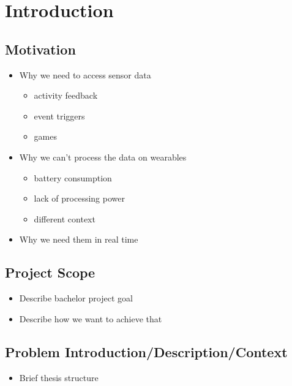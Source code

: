 \section{Introduction}
\label{sec:intro}


\subsection{Motivation}
\begin{itemize}[noitemsep]
	\item Why we need to access sensor data
		\begin{itemize}
			\item activity feedback
			\item event triggers
			\item games
		\end{itemize}
	\item Why we can't process the data on wearables
		\begin{itemize}
			\item battery consumption
			\item lack of processing power
			\item different context
		\end{itemize}
	\item Why we need them in real time
\end{itemize}
\lipsum[1]
\lipsum[2]


\subsection{Project Scope}
\begin{itemize}[noitemsep]
	\item Describe bachelor project goal
	\item Describe how we want to achieve that
\end{itemize}
\lipsum[1]
\lipsum[2]

\subsection{Problem Introduction/Description/Context}
\begin{itemize}[noitemsep]
	\item Brief thesis structure
\end{itemize}
\lipsum[1]


\clearpage